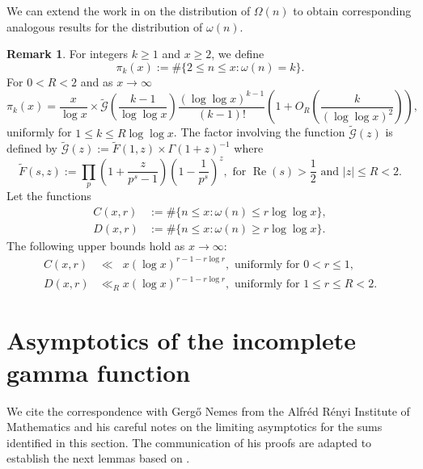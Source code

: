 \documentclass[11pt,reqno,a4letter]{article}
\numberwithin{equation}{section}
\numberwithin{figure}{section}
\numberwithin{table}{section}
\theoremstyle{plain}
\numberwithin{theorem}{section}
\theoremstyle{definition}
\newtheorem{remark}[theorem]{Remark}
\renewcommand{\Re}{\operatorname{Re}}
\begin{document}
We can extend the work in \cite{MV} on the distribution of $\Omega(n)$ to obtain 
corresponding analogous results for the distribution of $\omega(n)$. 

\begin{remark} 
\label{remark_MV_Pikx_FuncResultsAnnotated_v1} 
For integers $k  \geq 1$ and $x \geq 2$, we define 
\[
\pi_k(x) := \#\{2 \leq n \leq x: \omega(n)=k\}.
\]
For $0 < R < 2$ and as $x \rightarrow \infty$ 
\begin{equation}
\label{eqn_Pikx_UniformAsymptoticsStmt_from_MV_v2} 
\pi_k(x) = \frac{x}{\log x} \times 
     \widetilde{\mathcal{G}}\left(\frac{k-1}{\log\log x}\right) 
     \frac{(\log\log x)^{k-1}}{(k-1)!} \left( 
     1 + O_R\left(\frac{k}{(\log\log x)^2}\right) 
     \right), 
\end{equation}
uniformly for $1 \leq k \leq R\log\log x$. 
The factor involving the function $\widetilde{\mathcal{G}}(z)$ is 
defined by $\widetilde{\mathcal{G}}(z) := \widetilde{F}(1, z) \times \Gamma(1+z)^{-1}$ where 
\[
\widetilde{F}(s, z) := \prod_p \left(1 + \frac{z}{p^s-1}\right) \left(1 - \frac{1}{p^s}\right)^{z}, 
	\text{ for } \Re(s) > \frac{1}{2} \text{ and } |z| \leq R < 2. 
\]
Let the functions 
\begin{align*} 
C(x, r) & := \#\{n \leq x: \omega(n) \leq r \log\log x\}, \\ 
D(x, r) & := \#\{n \leq x: \omega(n) \geq r \log\log x\}. 
\end{align*} 
The following upper bounds hold as $x \rightarrow \infty$: 
\begin{align*} 
C(x, r) & \ll\phantom{_R} x (\log x)^{r - 1 - r \log r}, \text{ uniformly for } 0 < r \leq 1, \\ 
D(x, r) & \ll_R x (\log x)^{r - 1 - r \log r}, \text{ uniformly for } 1 \leq r \leq R < 2.
\end{align*} 
\end{remark} 

\section{Asymptotics of the incomplete gamma function} 
\label{subSection_OtherFactsAndResults} 

We cite the correspondence with Gerg\H{o} Nemes 
from the Alfr\'{e}d R\'{e}nyi Institute of Mathematics and his 
careful notes on the limiting asymptotics for the sums identified in this section. 
The communication of his proofs are adapted to establish the next lemmas based on 
\cite{NEMES2015C,NEMES2016,NEMES2019}. 
\end{document}
